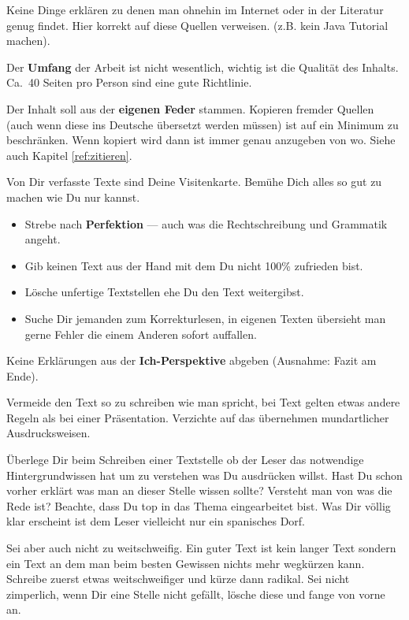 Keine Dinge erklären zu denen man ohnehin im Internet oder in der Literatur genug findet. Hier korrekt auf diese Quellen verweisen. (z.B. kein Java Tutorial machen).

Der \textbf{Umfang} der Arbeit ist nicht wesentlich, wichtig ist die Qualität des Inhalts.
Ca.\ 40 Seiten pro Person sind eine gute Richtlinie.

Der Inhalt soll aus der \textbf{eigenen Feder} stammen. 
Kopieren fremder Quellen (auch wenn diese ins Deutsche übersetzt werden müssen) ist auf ein Minimum zu beschränken. 
Wenn kopiert wird dann ist immer genau anzugeben von wo. 
Siehe auch Kapitel \ref{ref:zitieren}.

Von Dir verfasste Texte sind Deine Visitenkarte. 
Bemühe Dich alles so gut zu machen wie Du nur kannst.
\begin{itemize}
\item
Strebe nach \textbf{Perfektion} --- auch was die Rechtschreibung und Grammatik angeht.
\item
Gib keinen Text aus der Hand mit dem Du nicht 100\% zufrieden bist.
\item
Lösche unfertige Textstellen ehe Du den Text weitergibst.
\item
Suche Dir jemanden zum Korrekturlesen, in eigenen Texten übersieht man gerne Fehler die einem Anderen sofort auffallen.
\end{itemize}

Keine Erklärungen aus der \textbf{Ich-Perspektive} abgeben (Ausnahme: Fazit am Ende).

Vermeide den Text so zu schreiben wie man spricht, bei Text gelten etwas andere Regeln als bei einer Präsentation.
Verzichte auf das übernehmen mundartlicher Ausdrucksweisen.

Überlege Dir beim Schreiben einer Textstelle ob der Leser das notwendige Hintergrundwissen hat um zu verstehen was Du ausdrücken willst.
Hast Du schon vorher erklärt was man an dieser Stelle wissen sollte?
Versteht man von was die Rede ist?
Beachte, dass Du top in das Thema eingearbeitet bist. 
Was Dir völlig klar erscheint ist dem Leser vielleicht nur ein spanisches Dorf.

Sei aber auch nicht zu weitschweifig. 
Ein guter Text ist kein langer Text sondern ein Text an dem man beim besten Gewissen nichts mehr wegkürzen kann.
Schreibe zuerst etwas weitschweifiger und kürze dann radikal.
Sei nicht zimperlich, wenn Dir eine Stelle nicht gefällt, lösche diese und fange von vorne an.

